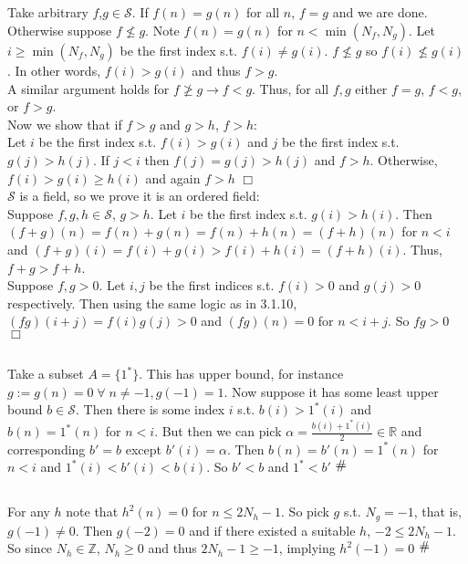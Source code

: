 \documentclass{article}
\newcommand{\contra}{\raisebox{\depth}{\#}}
\begin{document}
\subsection{}
Take arbitrary $f$,$g \in \mathcal{S}$. If $f(n) = g(n)$ for all $n$, $f=g$ and we are done.\\
Otherwise suppose $f\nleq g$. Note $f(n) = g(n)$ for $n<\min(N_f,N_g)$. Let $i\geq \min(N_f,N_g)$ be the first index s.t. $f(i) \neq g(i)$. $f\nleq g$ so $f(i) \nleq g(i)$. In other words, $f(i) > g(i)$ and thus $f>g$.\\
A similar argument holds for $f\ngeq g \rightarrow f<g$. Thus, for all $f,g$ either $f=g$, $f<g$, or $f>g$.\\
Now we show that if $f>g$ and $g>h$, $f>h$:\\
Let $i$ be the first index s.t. $f(i)>g(i)$ and $j$ be the first index s.t. $g(j)>h(j)$. If $j<i$ then $f(j) = g(j) > h(j)$ and $f>h$. Otherwise, $f(i)>g(i)\geq h(i)$ and again $f>h$ $\Box$\\
$\mathcal{S}$ is a field, so we prove it is an ordered field:\\
Suppose $f,g,h \in \mathcal{S}$, $g>h$. Let $i$ be the first index s.t. $g(i)>h(i)$. Then $(f+g)(n) = f(n) + g(n) = f(n) + h(n) = (f+h)(n)$ for $n<i$ and $(f+g)(i) = f(i) + g(i) > f(i) + h(i) = (f+h)(i)$. Thus, $f+g > f+h$.\\
Suppose $f,g > 0$. Let $i, j$ be the first indices s.t. $f(i)>0$ and $g(j)>0$ respectively. Then using the same logic as in 3.1.10, $(fg)(i+j) = f(i)g(j) > 0$ and $(fg)(n) = 0$ for $n<i+j$. So $fg > 0$ $\Box$

\subsection{}
Take a subset $A = \{ 1^*\}$. This has  upper bound, for instance $g:= g(n) = 0 \; \forall \; n\neq -1, g(-1) = 1$. Now suppose it has some least upper bound $b \in \mathcal{S}$. Then there is some index $i$ s.t. $b(i) > 1^*(i)$ and $b(n) = 1^*(n)$ for $n<i$. But then we can pick $\alpha = \frac{b(i)+1^*(i)}{2} \in \mathbb{R}$ and corresponding $b' = b$ except $b'(i) = \alpha$. Then $b(n) = b'(n) = 1^*(n)$ for $n<i$ and $1^*(i) < b'(i) < b(i)$. So $b' < b$ and $1^* < b'$ $\contra$

\subsection{}
For any $h$ note that $h^2(n) = 0$ for $n \leq 2N_h -1$. So pick $g$ s.t. $N_g = -1$, that is, $g(-1) \neq 0$. Then $g(-2) = 0$ and if there existed a suitable $h$, $-2 \leq 2N_h -1$. So since $N_h \in \mathbb{Z}$, $N_h \geq 0$ and thus $2N_h - 1 \geq -1$, implying $h^2(-1) = 0$ $\contra$
\end{document}
